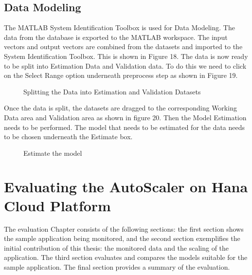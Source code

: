 \documentclass[article,type=msc,colorback,12pt,accentcolor=tud7b,table]{tudthesis}
\begin{document}
	\subsection{Data Modeling}
 
 The MATLAB System Identification Toolbox is used for Data Modeling. The data from the database is exported to the MATLAB workspace. The input vectors and output vectors are combined from the datasets and imported to the System Identification Toolbox. This is shown in Figure 18.  
  The data is now ready to be split into Estimation Data and Validation data. To do this we need to click on the Select Range option underneath preprocess step as shown in Figure 19. 
  
    \begin{figure}[h]
    	\begin{center}
    		\makebox[\textwidth]{\texttt{[image: D7]}}
    	\end{center}
    	\caption{Splitting the Data into Estimation and Validation Datasets}
    \end{figure}
 
 Once the data is split, the datasets are dragged to the corresponding Working Data area and Validation area as shown in figure 20. Then the Model Estimation needs to be performed. The model that needs to be estimated for the data needs to be chosen underneath the Estimate box.
 
     \begin{figure}[h]
     	\begin{center}
     		\makebox[\textwidth]{\texttt{[image: D8]}}
     	\end{center}
     	\caption{Estimate the model}
     \end{figure}

 
 \cleardoublepage
 \section{Evaluating the AutoScaler on Hana Cloud Platform}
 
 The evaluation Chapter consists of the following sections: the first section shows the sample application being monitored, and the second section exemplifies the initial contribution of this thesis: the monitored data and the scaling of the application. The third section evaluates and compares the models suitable for the sample application. The final section provides a summary of the evaluation. 
\end{document}
